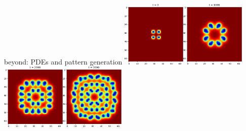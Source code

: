 \documentclass[urlcolor=blue,dvipsnames]{beamer}
\begin{document}
\begin{frame}{beyond: PDEs and pattern generation}
\mbox{\includegraphics[width=0.23\textwidth]{figs/pattern0}\quad\includegraphics[width=0.23\textwidth]{figs/pattern2}\quad\includegraphics[width=0.23\textwidth]{figs/pattern4}\quad\includegraphics[width=0.23\textwidth]{figs/pattern6}}

\bigskip
\end{frame}
\end{document}

